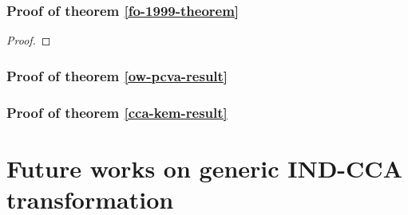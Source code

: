 \documentclass{article}
\begin{document}
\subsubsection{Proof of theorem \ref{fo-1999-theorem}}
\begin{proof}
    
\end{proof}

\subsubsection{Proof of theorem \ref{ow-pcva-result}}

\subsubsection{Proof of theorem \ref{cca-kem-result}}

\section{Future works on generic IND-CCA transformation}



\end{document}
